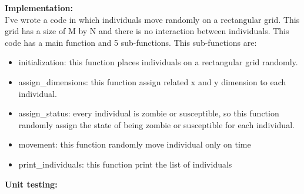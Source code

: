 \documentclass[12pt]{article}
\begin{document}
\textbf{Implementation:}\\
I've wrote a code in which individuals move randomly on a rectangular grid. This grid has a size of M by N and there is no interaction between individuals.
This code has a main function and 5 sub-functions. This sub-functions are:
\begin{itemize}
\item initialization: this function places individuals on a rectangular grid randomly.
\item assign\_dimensions: this function assign related x and y dimension to each individual.
\item assign\_status: every individual is zombie or susceptible, so this function randomly assign the state of being zombie or susceptible for each individual.
\item movement: this function randomly move individual only on time
\item print\_individuals: this function print the list of individuals
\end{itemize}
\textbf{Unit testing:}
\end{document}
